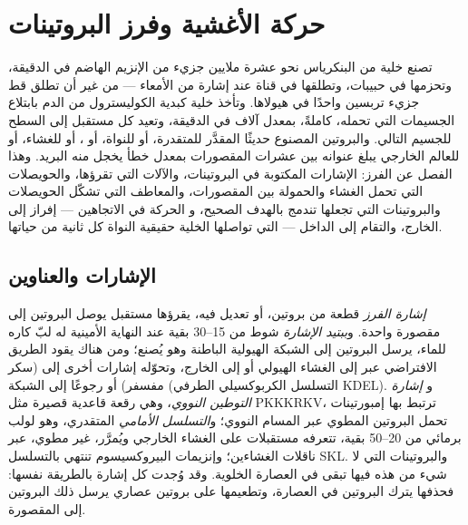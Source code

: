 \chapter{حركة الأغشية وفرز البروتينات}\label{ch:b3:membrane-traffic}

تصنع خلية من البنكرياس نحو عشرة ملايين جزيء من الإنزيم الهاضم
في الدقيقة، وتحزمها في حبيبات، وتطلقها في
قناة عند إشارة من الأمعاء --- من غير أن تطلق قط جزيء
تربسين واحدًا في هيولاها. وتأخذ خلية كبدية الكوليسترول من
الدم بابتلاع الجسيمات التي تحمله، كاملةً، بمعدل
آلاف في الدقيقة، وتعيد كل مستقبل إلى السطح
للجسيم التالي. والبروتين المصنوع حديثًا المقدَّر للمتقدرة، أو
للنواة، أو ، أو للغشاء، أو للعالم الخارجي يبلغ عنوانه
بين عشرات المقصورات بمعدل خطأ يخجل منه
البريد. وهذا الفصل عن الفرز: الإشارات
المكتوبة في البروتينات، والآلات التي تقرؤها، والحويصلات التي
تحمل الغشاء والحمولة بين المقصورات، والمعاطف التي تشكّل
الحويصلات والبروتينات التي تجعلها تندمج بالهدف الصحيح، و
الحركة في الاتجاهين --- إفراز إلى الخارج، والتقام إلى الداخل --- التي
تواصلها الخلية حقيقية النواة كل ثانية من حياتها.

\section{الإشارات والعناوين}

\begin{definition}\label{def:b3:membrane-traffic:signals}
\emph{إشارة الفرز} قطعة من بروتين، أو تعديل
فيه، يقرؤها مستقبل يوصل البروتين إلى مقصورة واحدة.
و\emph{ببتيد الإشارة} شوط من \numrange{15}{30} بقية عند
النهاية الأمينية له لبّ كاره للماء، يرسل البروتين إلى
الشبكة الهيولية الباطنة وهو يُصنع؛ ومن هناك يقود الطريق الافتراضي
عبر  إلى الغشاء الهيولي أو إلى الخارج،
وتحوّله إشارات أخرى إلى  (سكر مفسفر) أو
رجوعًا إلى الشبكة (التسلسل الكربوكسيلي الطرفي KDEL). و
\emph{إشارة التوطين النووي}، وهي رقعة قاعدية قصيرة مثل
PKKKRKV، ترتبط بها إمبورتينات تحمل البروتين المطوي عبر
المسام النووي؛ و\emph{التسلسل الأمامي} المتقدري، وهو
لولب برمائي من \numrange{20}{50} بقية، تتعرفه مستقبلات على
الغشاء الخارجي ويُمرَّر، غير مطوي، عبر ناقلات الغشاءين؛
وإنزيمات البيروكسيسوم تنتهي بالتسلسل SKL. والبروتينات التي لا شيء من هذه فيها
تبقى في العصارة الخلوية. وقد وُجدت كل إشارة بالطريقة نفسها: فحذفها
يترك البروتين في العصارة، وتطعيمها على بروتين عصاري
يرسل ذلك البروتين إلى المقصورة.
\end{definition}

